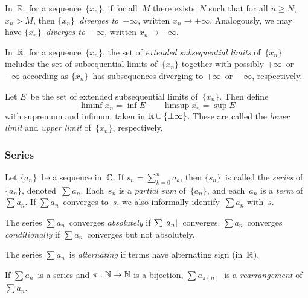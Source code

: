 \begin{defn}
In~\(\mathbb{R}\), for a sequence~\(\{x_n\}\), if for all~\(M\) there exists~\(N\) such that for all \(n\ge N\), \(x_n>M\), then \emph{\(\{x_n\}\)~diverges to~\(+\infty\)}, written \(x_n\to+\infty\). Analogously, we may have \emph{\(\{x_n\}\)~diverges to~\(-\infty\)}, written \(x_n\to-\infty\).
\end{defn}

\begin{defn}
In~\(\mathbb{R}\), for a sequence~\(\{x_n\}\), the set of \emph{extended subsequential limits} of~\(\{x_n\}\) includes the set of subsequential limits of~\(\{x_n\}\) together with possibly \(+\infty\)~or~\(-\infty\) according as \(\{x_n\}\)~has subsequences diverging to \(+\infty\)~or~\(-\infty\), respectively.

Let \(E\)~be the set of extended subsequential limits of~\(\{x_n\}\). Then define
\[\liminf x_n=\inf E\qquad\limsup x_n=\sup E\]
with supremum and infimum taken in \(\mathbb{R}\cup\{\pm\infty\}\). These are called the \emph{lower limit} and \emph{upper limit} of~\(\{x_n\}\), respectively.
\end{defn}

\subsubsection*{Series}
\begin{defn}
Let \(\{a_n\}\)~be a sequence in~\(\mathbb{C}\). If \(s_n=\sum_{k=0}^n a_k\), then \(\{s_n\}\)~is called the \emph{series} of~\(\{a_n\}\), denoted~\(\sum a_n\). Each~\(s_n\) is a \emph{partial sum} of~\(\{a_n\}\), and each~\(a_n\) is a \emph{term} of~\(\sum a_n\). If \(\sum a_n\)~converges to~\(s\), we also informally identify~\(\sum a_n\) with~\(s\).
\end{defn}

\begin{defn}
The series \(\sum a_n\)~converges \emph{absolutely} if \(\sum|{a_n}|\)~converges. \(\sum a_n\)~converges \emph{conditionally} if \(\sum a_n\)~converges but not absolutely.
\end{defn}

\begin{defn}
The series \(\sum a_n\)~is \emph{alternating} if terms have alternating sign (in~\(\mathbb{R}\)).
\end{defn}

\begin{defn}
If \(\sum a_n\)~is a series and \(\pi:\mathbb{N}\to\mathbb{N}\) is a bijection, \(\sum a_{\pi(n)}\)~is a \emph{rearrangement} of~\(\sum a_n\).
\end{defn}

